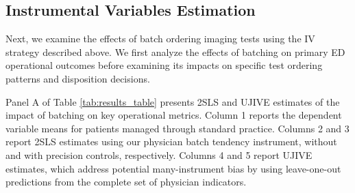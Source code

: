\documentclass[,,blindrev]{informs}
\begin{document}
\subsection{Instrumental Variables Estimation}\label{sec:iv_results}

Next, we examine the effects of batch ordering imaging tests using the
IV strategy described above. We first analyze the effects of batching on
primary ED operational outcomes before examining its impacts on specific
test ordering patterns and disposition decisions.

Panel A of Table \ref{tab:results_table} presents 2SLS and UJIVE
estimates of the impact of batching on key operational metrics. Column 1
reports the dependent variable means for patients managed through
standard practice. Columns 2 and 3 report 2SLS estimates using our
physician batch tendency instrument, without and with precision
controls, respectively. Columns 4 and 5 report UJIVE estimates, which
address potential many-instrument bias by using leave-one-out
predictions from the complete set of physician indicators.
\end{document}
